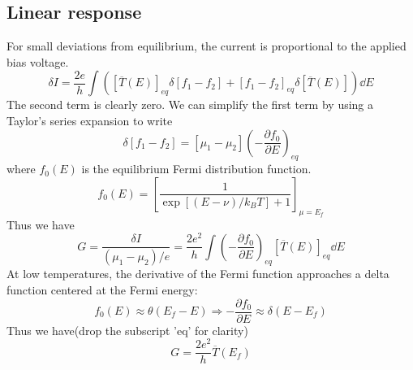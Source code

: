 \documentclass[11pt,a4paper]{book}
\theoremstyle{plain}
\theoremstyle{definition}
\theoremstyle{remark}
\begin{document}
\subsection{Linear response}
For small deviations from equilibrium, the current is proportional to the applied bias voltage.
\begin{equation}
    \delta I = \frac{2 e}{h} \int \left( \left[ \overline{T}(E) \right]_{eq} \delta[f_1-f_2] + [f_1-f_2]_{eq} \delta \left[ \overline{T}(E) \right] \right) \dd E
\end{equation}
The second term is clearly zero. We can simplify the first term by using a Taylor's series expansion to write
\begin{equation}
    \delta[f_1 - f_2] = [\mu_1 - \mu_2] \left( -\frac{\partial f_0}{\partial E} \right)_{eq}
\end{equation}
where $f_0(E)$ is the equilibrium Fermi distribution function. 
\begin{equation}
    f_0(E) = \left[ \frac{1}{\exp \left[(E-\nu)/k_B T\right] + 1}  \right]_{\mu = E_f}
\end{equation}
Thus we have
\begin{equation}
    G = \frac{\delta I}{(\mu_1 - \mu_2)/e} = \frac{2 e^2}{h} \int \left( -\frac{\partial f_0}{\partial E} \right)_{eq} \left[ \overline{T}(E) \right]_{eq} \dd E
\end{equation}
At low temperatures, the derivative of the Fermi function approaches a delta function centered at the Fermi energy:
\begin{equation}
    f_0(E) \approx \theta(E_f - E) \Rightarrow -\frac{\partial f_0}{\partial E} \approx \delta(E - E_f)
\end{equation}
Thus we have(drop the subscript 'eq' for clarity)
\begin{equation}
    G = \frac{2 e^2}{h} \overline{T}(E_f)
\end{equation}
\end{document}
